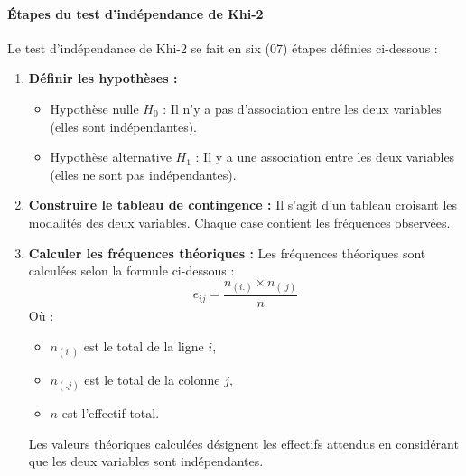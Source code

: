 \documentclass[a4paper,12pt]{article}
\begin{document}
\paragraph{Étapes du test d’indépendance de Khi-2}

Le test d’indépendance de Khi-2 se fait en six (07) étapes définies ci-dessous :

\begin{enumerate}
    \item \textbf{Définir les hypothèses :}
    \begin{itemize}
        \item Hypothèse nulle \( H_0 \) : Il n’y a pas d’association entre les deux variables (elles sont indépendantes).
        \item Hypothèse alternative \( H_1 \) : Il y a une association entre les deux variables (elles ne sont pas indépendantes).
    \end{itemize}
    \item \textbf{Construire le tableau de contingence :} 
    Il s’agit d’un tableau croisant les modalités des deux variables. Chaque case contient les fréquences observées.
    
    \item \textbf{Calculer les fréquences théoriques :} 
    Les fréquences théoriques sont calculées selon la formule ci-dessous :
    \[
    e_{ij} = \frac{n_{(i.)} \times n_{(.j)}}{n}
    \]
    Où :
    \begin{itemize}
        \item \( n_{(i.)} \) est le total de la ligne \( i \),
        \item \( n_{(.j)} \) est le total de la colonne \( j \),
        \item \( n \) est l'effectif total.
    \end{itemize}
    Les valeurs théoriques calculées désignent les effectifs attendus en considérant que les deux variables sont indépendantes.
\end{enumerate}
\end{document}
